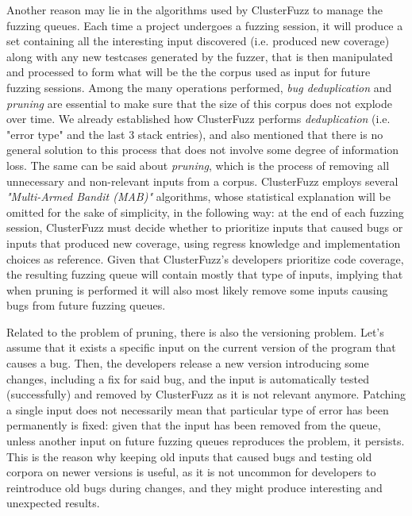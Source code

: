 Another reason may lie in the algorithms used by ClusterFuzz to manage the fuzzing queues. Each time a project undergoes a fuzzing session, it will produce a set containing all the interesting input discovered (i.e. produced new coverage) along with any new testcases generated by the fuzzer, that is then manipulated and processed to form what will be the the corpus used as input for future fuzzing sessions. Among the many operations performed, \textit{bug deduplication} and \textit{pruning} are essential to make sure that the size of this corpus does not explode over time. We already established how ClusterFuzz performs \textit{deduplication} (i.e. "error type" and the last 3 stack entries), and also mentioned that there is no general solution to this process that does not involve some degree of information loss.
The same can be said about \textit{pruning}, which is the process of removing all unnecessary and non-relevant inputs from a corpus. ClusterFuzz employs several \textit{"Multi-Armed Bandit (MAB)"} \cite{mab} algorithms, whose statistical explanation will be omitted for the sake of simplicity, in the following way: at the end of each fuzzing session, ClusterFuzz must decide whether to prioritize inputs that caused bugs or inputs that produced new coverage, using regress knowledge and implementation choices as reference. Given that ClusterFuzz's developers prioritize code coverage, the resulting fuzzing queue will contain mostly that type of inputs, implying that when pruning is performed it will also most likely remove some inputs causing bugs from future fuzzing queues.

Related to the problem of pruning, there is also the versioning problem.
Let's assume that it exists a specific input on the current version of the program that causes a bug. Then, the developers release a new version introducing some changes, including a fix for said bug, and the input is automatically tested (successfully) and removed by ClusterFuzz as it is not relevant anymore. Patching a single input does not necessarily mean that particular type of error has been permanently is fixed: given that the input has been removed from the queue, unless another input on future fuzzing queues reproduces the problem, it persists. This is the reason why keeping old inputs that caused bugs and testing old corpora on newer versions is useful, as it is not uncommon for developers to reintroduce old bugs during changes, and they might produce interesting and unexpected results.


